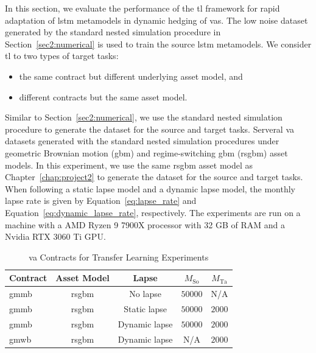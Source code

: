 In this section, we evaluate the performance of the \gls{tl} framework for rapid adaptation of \gls{lstm} metamodels in dynamic hedging of \gls{va}s.
The low noise dataset generated by the standard nested simulation procedure in Section~\ref{sec2:numerical} is used to train the source \gls{lstm} metamodels.
We consider \gls{tl} to two types of target tasks: 
\begin{itemize}
    \item the same contract but different underlying asset model, and
    \item different contracts but the same asset model.
\end{itemize}  
Similar to Section~\ref{sec2:numerical}, we use the standard nested simulation procedure to generate the dataset for the source and target tasks.
Serveral \gls{va} datasets generated with the standard nested simulation procedures under geometric Brownian motion (\gls{gbm}) and regime-switching \gls{gbm} (\gls{rsgbm}) asset models.
In this experiment, we use the same \gls{rsgbm} asset model as Chapter~\ref{chap:project2} to generate the dataset for the source and target tasks.
When following a static lapse model and a dynamic lapse model, the monthly lapse rate is given by Equation~\ref{eq:lapse_rate} and Equation~\ref{eq:dynamic_lapse_rate}, respectively.
The experiments are run on a machine with a AMD Ryzen 9 7900X processor with 32 GB of RAM and a Nvidia RTX $\num{3060}$ Ti GPU.

\begin{table}[ht!] 
    \centering
    \begin{tabular}{lcccc} 
    \toprule
    \textbf{Contract} & \textbf{Asset Model} & \textbf{Lapse} & \textbf{$M_{\text{So}}$}  & \textbf{$M_{\text{Ta}}$}\\
    \midrule
    \gls{gmmb} & \gls{rsgbm} & No lapse & $\num{50000}$ & N/A \\
    \gls{gmmb} & \gls{rsgbm} & Static lapse & $\num{50000}$ & $\num{2000}$ \\
    \gls{gmmb} & \gls{rsgbm} & Dynamic lapse & $\num{50000}$ & $\num{2000}$ \\
    \gls{gmwb} & \gls{rsgbm} & Dynamic lapse & N/A & $\num{2000}$ \\
    \bottomrule
    \end{tabular}
    \caption{\gls{va} Contracts for Transfer Learning Experiments}
    \label{tab3:contracts}
\end{table}


